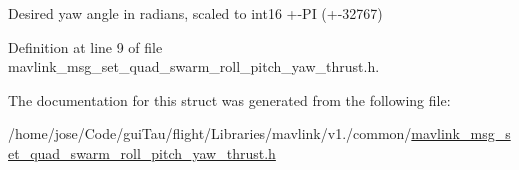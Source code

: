 Desired yaw angle in radians, scaled to int16 +-\/\-P\-I (+-\/32767) 



Definition at line 9 of file mavlink\-\_\-msg\-\_\-set\-\_\-quad\-\_\-swarm\-\_\-roll\-\_\-pitch\-\_\-yaw\-\_\-thrust.\-h.



The documentation for this struct was generated from the following file\-:\begin{DoxyCompactItemize}
\item 
/home/jose/\-Code/gui\-Tau/flight/\-Libraries/mavlink/v1./common/\hyperlink{mavlink__msg__set__quad__swarm__roll__pitch__yaw__thrust_8h}{mavlink\-\_\-msg\-\_\-set\-\_\-quad\-\_\-swarm\-\_\-roll\-\_\-pitch\-\_\-yaw\-\_\-thrust.\-h}\end{DoxyCompactItemize}
